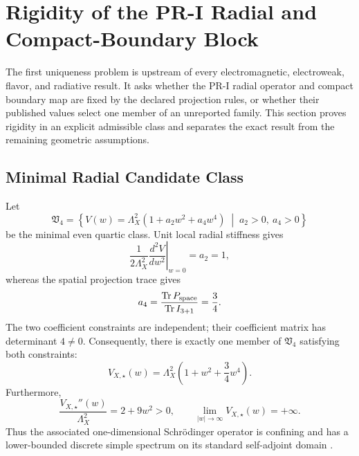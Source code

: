 \section{Rigidity of the PR-I Radial and Compact-Boundary Block}
\label{sec:pr35-pr1-radial-compact-rigidity}

The first uniqueness problem is upstream of every electromagnetic,
electroweak, flavor, and radiative result.  It asks whether the PR-I radial
operator and compact boundary map are fixed by the declared projection rules,
or whether their published values select one member of an unreported family.
This section proves rigidity in an explicit admissible class and separates the
exact result from the remaining geometric assumptions.

\subsection{Minimal Radial Candidate Class}
\label{subsec:pr35-minimal-radial-class}

Let
\begin{equation}
\mathfrak V_4
=
\left\{
V(w)=\Lambda_X^2\left(1+a_2w^2+a_4w^4\right)
\;\middle|\;
a_2>0,\ a_4>0
\right\}
\label{eq:pr35-radial-admissible-class}
\end{equation}
be the minimal even quartic class.  Unit local radial stiffness gives
\begin{equation}
\left.
\frac{1}{2\Lambda_X^2}\frac{d^2V}{dw^2}
\right|_{w=0}
=a_2=1,
\label{eq:pr35-a2-unique}
\end{equation}
whereas the spatial projection trace gives
\begin{equation}
a_4
=
\frac{\operatorname{Tr}P_{\rm space}}
{\operatorname{Tr}I_{3+1}}
=
\frac34.
\label{eq:pr35-a4-unique}
\end{equation}
The two coefficient constraints are independent; their coefficient matrix has
determinant $4\neq0$.  Consequently, there is exactly one member of
\(\mathfrak V_4\) satisfying both constraints:
\begin{equation}
\boxed{
V_{X,\star}(w)
=
\Lambda_X^2\left(1+w^2+\frac34w^4\right).}
\label{eq:pr35-radial-unique}
\end{equation}
Furthermore,
\begin{equation}
\frac{V_{X,\star}''(w)}{\Lambda_X^2}
=2+9w^2>0,
\qquad
\lim_{|w|\to\infty}V_{X,\star}(w)=+\infty.
\end{equation}
Thus the associated one-dimensional Schr\"odinger operator is confining and has a lower-bounded discrete simple spectrum on its standard self-adjoint
domain \cite{ReedSimon_1975}.

